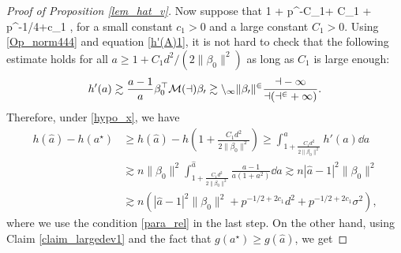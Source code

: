 \documentclass[aos,preprint]{imsart}
\begin{document}
\begin{proof}[Proof of Proposition \ref{lem_hat_v}]


Now suppose that 
\be\label{hypo_x}1 + p^{-C_1}+  C_1 + p^{-1/4+c_1} \le  {} ,\ee
for a small constant $c_1>0$ and a large constant $C_1> 0$. 
Using \eqref{Op_norm444} and equation \eqref{h'(A)1}, it is not hard to check that the following estimate holds for all $a \ge 1+C_1 d^2/(2{\|\beta_0\|^2})$ as long as $C_1$ is large enough: %
	\[ h'(a) \gtrsim \frac{a-1}{a} \beta_0^\top  \cal M(a) \beta_0 \gtrsim n_1\|\beta_0\|^2\frac{a-1}{a (a^2  + 1)}.\]
Therefore, under \eqref{hypo_x}, we have %
\begin{align}
		  h(\hat a)-h(a^\star) & \ge h(\hat a) - h\left(1+\frac{C_1d^2}{2\|\beta_0\|^2 }\right)
	\ge \int_{1+\frac{C_1 d^2}{2\|\beta_0\|^2}}^{\hat a} h'(a)\dd a \nonumber\\
	& \gtrsim n \|\beta_0\|^2 \int_{1+\frac{C_1 d^2}{2\|\beta_0\|^2}}^{\hat a} \frac{a-1}{a(1 + a^2)} \dd a  \gtrsim  n |\hat a-1|^2\|\beta_0\|^2\nonumber \\
	& \gtrsim n \left(|\hat a-1|^2\|\beta_0\|^2 + p^{-1/2+2c_1}d^2+ p^{-1/2+2c_1}\sigma^2\right), \label{ha-ha}
\end{align}
where we use the condition \eqref{para_rel} in the last step. 
On the other hand, using Claim \ref{claim_largedev1} and the fact that $g(a^\star)\ge g(\hat a)$, we get

\end{proof}
\end{document}
